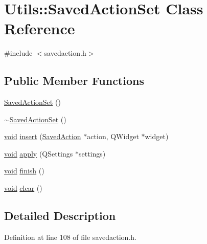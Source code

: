 \hypertarget{class_utils_1_1_saved_action_set}{\section{Utils\-:\-:Saved\-Action\-Set Class Reference}
\label{class_utils_1_1_saved_action_set}
}


{\ttfamily \#include $<$savedaction.\-h$>$}

\subsection*{Public Member Functions}
\begin{DoxyCompactItemize}
\item 
\hyperlink{class_utils_1_1_saved_action_set_a756e428cacfa6568940ed41d9bd8c6d7}{Saved\-Action\-Set} ()
\item 
\hyperlink{class_utils_1_1_saved_action_set_a8cbd505189484f0860f3a4e902292408}{$\sim$\-Saved\-Action\-Set} ()
\item 
\hyperlink{group___u_a_v_objects_plugin_ga444cf2ff3f0ecbe028adce838d373f5c}{void} \hyperlink{class_utils_1_1_saved_action_set_a92ee9410973931c6802b39223d77722c}{insert} (\hyperlink{class_utils_1_1_saved_action}{Saved\-Action} $\ast$action, Q\-Widget $\ast$widget)
\item 
\hyperlink{group___u_a_v_objects_plugin_ga444cf2ff3f0ecbe028adce838d373f5c}{void} \hyperlink{class_utils_1_1_saved_action_set_aea445350708ef606ab74ddac03e4d690}{apply} (Q\-Settings $\ast$settings)
\item 
\hyperlink{group___u_a_v_objects_plugin_ga444cf2ff3f0ecbe028adce838d373f5c}{void} \hyperlink{class_utils_1_1_saved_action_set_a41af1237602ed061875f9a062785a25d}{finish} ()
\item 
\hyperlink{group___u_a_v_objects_plugin_ga444cf2ff3f0ecbe028adce838d373f5c}{void} \hyperlink{class_utils_1_1_saved_action_set_a3125297411f8e5ec231a07c6de22a6ee}{clear} ()
\end{DoxyCompactItemize}


\subsection{Detailed Description}


Definition at line 108 of file savedaction.\-h.



